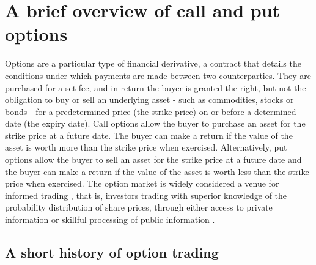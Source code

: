 \section{A brief overview of call and put options}

Options are a particular type of financial derivative, a contract that details the conditions under which payments are made between two counterparties. They are purchased for a set fee, and in return the buyer is granted the right, but not the obligation to buy or sell an underlying asset - such as commodities, stocks or bonds - for a predetermined price (the strike price) on or before a determined date (the expiry date).
\nline
Call options allow the buyer to purchase an asset for the strike price at a future date. The buyer can make a return if the value of the asset is worth more than the strike price when exercised. Alternatively, put options allow the buyer to sell an asset for the strike price at a future date and the buyer can make a return if the value of the asset is worth less than the strike price when exercised.
\nline
The option market is widely considered a venue for informed trading \cite{li2021effect,hu2014,chak2004}, that is, investors trading with superior knowledge of the probability distribution of share prices, through either access to private information or skillful processing of public information \cite{grossman1975application}. 

\subsection{A short history of option trading}

